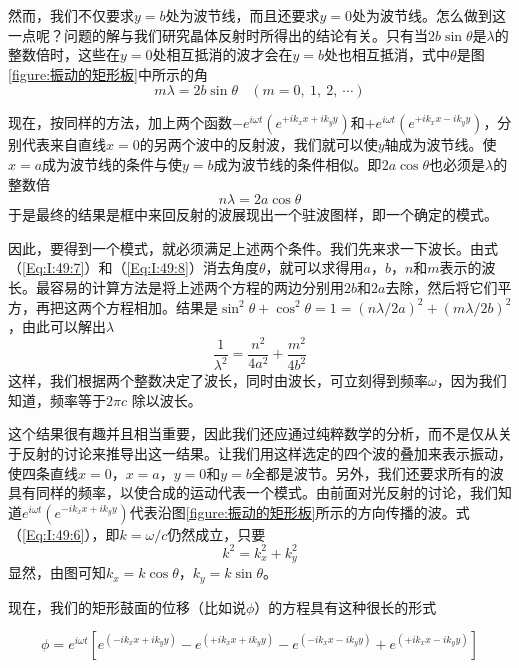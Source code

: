 然而，我们不仅要求$y=b$处为波节线，而且还要求$y=0$处为波节线。怎么做到这一点呢？问题的解与我们研究晶体反射时所得出的结论有关。只有当$2b\sin\theta$是$\lambda$的整数倍时，这些在$y=0$处相互抵消的波才会在$y=b$处也相互抵消，式中$\theta$是图\ref{figure:振动的矩形板}中所示的角
\begin{equation}
    \label{Eq:I:49:7}
    m\lambda = 2b\sin\theta ~~~~ (m = 0,~1,~2,~\cdots)
\end{equation}

现在，按同样的方法，加上两个函数$-e^{i\omega t}(e^{+ik_xx+ik_yy})$和$+e^{i\omega t}(e^{+ik_xx-ik_yy})$，分别代表来自直线$x=0$的另两个波中的反射波，我们就可以使$y$轴成为波节线。使$x=a$成为波节线的条件与使$y=b$成为波节线的条件相似。即$2a\cos\theta$也必须是$\lambda$的整数倍
\begin{equation}
    \label{Eq:I:49:8}
    n\lambda = 2a\cos\theta
\end{equation}
于是最终的结果是框中来回反射的波展现出一个驻波图样，即一个确定的模式。

因此，要得到一个模式，就必须满足上述两个条件。我们先来求一下波长。由式（\ref{Eq:I:49:7}）和（\ref{Eq:I:49:8}）消去角度$\theta$，就可以求得用$a$，$b$，$n$和$m$表示的波长。最容易的计算方法是将上述两个方程的两边分别用$2b$和$2a$去除，然后将它们平方，再把这两个方程相加。结果是$\sin^2\theta +\cos^2\theta=1=(n\lambda /2a)^2 +(m\lambda/2b)^2$，由此可以解出$\lambda$
\begin{equation}
    \label{Eq:I:49:9}
    \frac{1}{\lambda^2} = \frac{n^2}{4a^2} + \frac{m^2}{4b^2}
\end{equation}
这样，我们根据两个整数决定了波长，同时由波长，可立刻得到频率$\omega$，因为我们知道，频率等于$2\pi c$ 除以波长。

这个结果很有趣并且相当重要，因此我们还应通过纯粹数学的分析，而不是仅从关于反射的讨论来推导出这一结果。让我们用这样选定的四个波的叠加来表示振动，使四条直线$x=0$，$x=a$，$y=0$和$y=b$全都是波节。另外，我们还要求所有的波具有同样的频率，以使合成的运动代表一个模式。由前面对光反射的讨论，我们知道$e^{i\omega t}(e^{-ik_xx+ik_yy})$代表沿图\ref{figure:振动的矩形板}所示的方向传播的波。式（\ref{Eq:I:49:6}），即$k =\omega /c$仍然成立，只要
\begin{equation}
    \label{Eq:I:49:10}
    k^2 = k_x^2 + k_y^2
\end{equation}
显然，由图可知$k_x =k\cos\theta$，$k_y =k\sin\theta$。

现在，我们的矩形鼓面的位移（比如说$\phi$）的方程具有这种很长的形式

\begin{equation}
    \label{Eq:I:49:11a}
    \tag{49.11a}
    \phi = e^{i\omega t} \left[e^{(-ik_xx+ik_yy)}-e^{(+ik_xx+ik_yy)}-e^{(-ik_xx-ik_yy)}+e^{(+ik_xx-ik_yy)}\right]
\end{equation}

